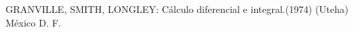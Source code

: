 \begin{thebibliography}{9}
	 GRANVILLE, SMITH, LONGLEY: Cálculo diferencial e integral.(1974) (Uteha) México D. F.

\end{thebibliography}